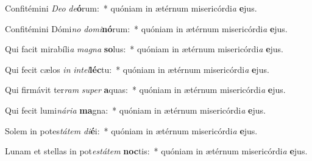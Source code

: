 \item Confitémini \textit{De}\textit{o} \textit{de}\textbf{ó}rum:~* quóniam in ætérnum misericórdi\textit{a} \textbf{e}jus.
\item Confitémini Dómi\textit{no} \textit{do}\textit{mi}\textbf{nó}rum:~* quóniam in ætérnum misericórdi\textit{a} \textbf{e}jus.
\item Qui facit mirabíli\textit{a} \textit{ma}\textit{gna} \textbf{so}lus:~* quóniam in ætérnum misericórdi\textit{a} \textbf{e}jus.
\item Qui fecit cælos \textit{in} \textit{in}\textit{tel}\textbf{léc}tu:~* quóniam in ætérnum misericórdi\textit{a} \textbf{e}jus.
\item Qui firmávit ter\textit{ram} \textit{su}\textit{per} \textbf{a}quas:~* quóniam in ætérnum misericórdi\textit{a} \textbf{e}jus.
\item Qui fecit lumi\textit{ná}\textit{ri}\textit{a} \textbf{ma}gna:~* quóniam in ætérnum misericórdi\textit{a} \textbf{e}jus.
\item Solem in potes\textit{tá}\textit{tem} \textit{di}\textbf{é}i:~* quóniam in ætérnum misericórdi\textit{a} \textbf{e}jus.
\item Lunam et stellas in pot\textit{es}\textit{tá}\textit{tem} \textbf{noc}tis:~* quóniam in ætérnum misericórdi\textit{a} \textbf{e}jus.

